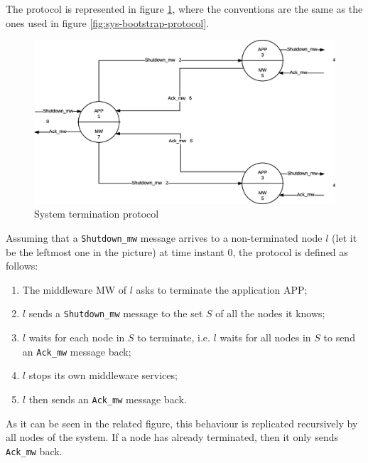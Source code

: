 The protocol is represented in figure \ref{fig:sys-termination-protocol}, where
the conventions are the same as the ones used in figure
\ref{fig:sys-bootstrap-protocol}.

\begin{figure}[H]
  \centering
  \includegraphics[width=\columnwidth]{images/solution/termination.eps}
  \caption{System termination protocol}
  \label{fig:sys-termination-protocol}
\end{figure}

Assuming that a \texttt{Shutdown\_mw} message arrives to a non-terminated node
$l$ (let it be the leftmost one in the picture) at time instant 0, the protocol
is defined as follows:

\begin{enumerate}
  \item The middleware MW of $l$ asks to terminate the application APP;
  \item $l$ sends a \texttt{Shutdown\_mw} message to the set
    $S$ of all the nodes it knows;
  \item $l$ waits for each node in $S$ to terminate, i.e. $l$ waits for all
    nodes in $S$ to send an \texttt{Ack\_mw} message back;
  \item $l$ stops its own middleware services;
  \item $l$ then sends an \texttt{Ack\_mw} message back.
\end{enumerate}

As it can be seen in the related figure, this behaviour is replicated
recursively by all nodes of the system. If a node has already terminated, then
it only sends \texttt{Ack\_mw} back.
